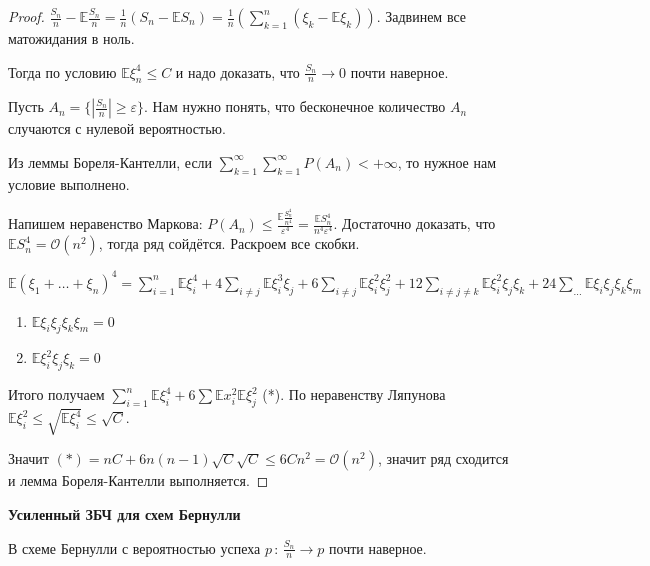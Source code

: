 \begin{proof}
    $\frac{S_n}{n} - \mathbb{E}\frac{S_n}{n} = \frac{1}{n} (S_n - \mathbb{E}S_n) = \frac{1}{n}(\sum_{k = 1}^n (\xi_k - \mathbb{E}\xi_k))$. Задвинем все
    матожидания в ноль.

    Тогда по условию $\mathbb{E} \xi_n^4 \leqslant C$ и надо доказать, что $\frac{S_n}{n} \rightarrow 0$ почти наверное.
    
    Пусть $A_n = \{ \left | \frac{S_n}{n} \right | \geqslant \varepsilon \}$. Нам нужно понять, что бесконечное количество $A_n$ случаются
    с нулевой вероятностью. 

    Из леммы Бореля-Кантелли, если $\sum_{k = 1}^{\infty} \sum_{k = 1}^{\infty} P(A_n) < +\infty$, то нужное нам условие выполнено.

    Напишем неравенство Маркова: $P(A_n) \leqslant \frac{\mathbb{E} \frac{S_n^4}{n^4}}{\varepsilon^4} = \frac{\mathbb{E}S_n^4}{n^4\varepsilon^4}$. Достаточно доказать, что
    $\mathbb{E}S_n^4 = \mathcal{O}(n^2)$, тогда ряд сойдётся. Раскроем все скобки.

    $\mathbb{E}(\xi_1 + \ldots + \xi_n)^4 = \sum_{i = 1}^n \mathbb{E}\xi_i^4 + 4\sum_{i \neq j}\mathbb{E}\xi_i^3\xi_j +
     6\sum_{i \neq j}\mathbb{E}\xi_i^2 \xi_j^2 + 12\sum_{i \neq j \neq k} \mathbb{E} \xi_i^2 \xi_j \xi_k + 24\sum_{\ldots} \mathbb{E}\xi_i \xi_j \xi_k \xi_m$

    \begin{enumerate}
        \item {
            $\mathbb{E}\xi_i \xi_j \xi_k \xi_m = 0$
        }
        \item {
            $\mathbb{E} \xi_i^2 \xi_j \xi_k = 0$
        }
    \end{enumerate}

    Итого получаем $\sum_{i = 1}^n \mathbb{E}\xi_i^4 + 6 \sum \mathbb{E}x_i^2 \mathbb{E}\xi_j^2$ (*). По неравенству Ляпунова
    $\mathbb{E}\xi_i^2 \leqslant \sqrt{\mathbb{E}\xi_i^4} \leqslant \sqrt{C}$.

    Значит $(*) = nC + 6n(n-1)\sqrt{C}\sqrt{C} \leqslant 6Cn^2 = \mathcal{O}(n^2)$, значит ряд сходится и лемма Бореля-Кантелли выполняется.
\end{proof}

\begin{consequence}
    \textbf{Усиленный ЗБЧ для схем Бернулли}

    В схеме Бернулли с вероятностью успеха $p \, : \, \frac{S_n}{n} \rightarrow p$ почти наверное.
\end{consequence}


